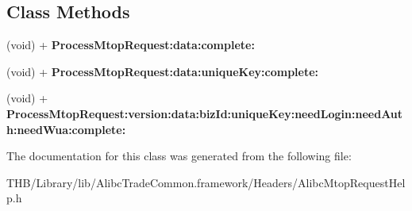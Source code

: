 \subsection*{Class Methods}
\begin{DoxyCompactItemize}
\item 
\mbox{\label{interface_alibc_mtop_request_help_a45ae6e969413cb4bea96bcd15d43ad6b}} 
(void) + {\bfseries Process\+Mtop\+Request\+:data\+:complete\+:}
\item 
\mbox{\label{interface_alibc_mtop_request_help_a9294db458386ad681995381bdfa13989}} 
(void) + {\bfseries Process\+Mtop\+Request\+:data\+:unique\+Key\+:complete\+:}
\item 
\mbox{\label{interface_alibc_mtop_request_help_afb1e47b1c2014dc004078ff2bffa1d49}} 
(void) + {\bfseries Process\+Mtop\+Request\+:version\+:data\+:biz\+Id\+:unique\+Key\+:need\+Login\+:need\+Auth\+:need\+Wua\+:complete\+:}
\end{DoxyCompactItemize}


The documentation for this class was generated from the following file\+:\begin{DoxyCompactItemize}
\item 
T\+H\+B/\+Library/lib/\+Alibc\+Trade\+Common.\+framework/\+Headers/Alibc\+Mtop\+Request\+Help.\+h\end{DoxyCompactItemize}
